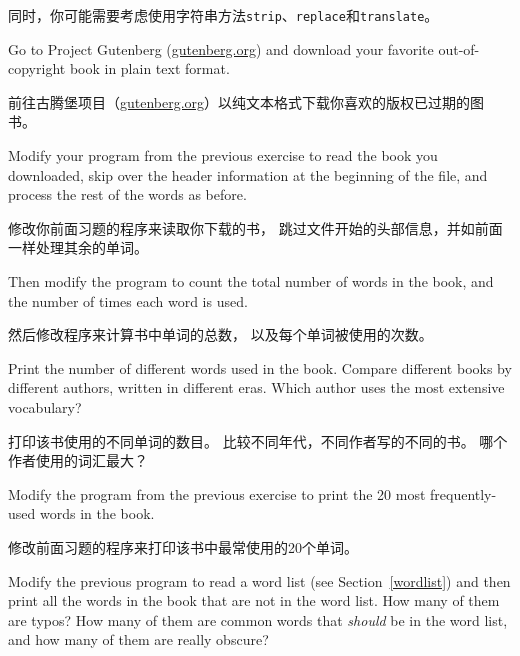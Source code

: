 \documentclass[10pt]{book}
\begin{document}
\begin{CJK}{UTF8}{gbsn}
\begin{exercise}
同时，你可能需要考虑使用字符串方法{\tt strip}、{\tt replace}和{\tt translate}。

\end{exercise}


\begin{exercise}

Go to Project Gutenberg (\url{gutenberg.org}) and download 
your favorite out-of-copyright book in plain text format.

前往古腾堡项目（\url{gutenberg.org}）以纯文本格式下载你喜欢的版权已过期的图书。

Modify your program from the previous exercise to read the book
you downloaded, skip over the header information at the beginning
of the file, and process the rest of the words as before.

修改你前面习题的程序来读取你下载的书，
跳过文件开始的头部信息，并如前面一样处理其余的单词。

Then modify the program to count the total number of words in
the book, and the number of times each word is used.

然后修改程序来计算书中单词的总数，
以及每个单词被使用的次数。

Print the number of different words used in the book.  Compare
different books by different authors, written in different eras.
Which author uses the most extensive vocabulary?

打印该书使用的不同单词的数目。
比较不同年代，不同作者写的不同的书。
哪个作者使用的词汇最大？

\end{exercise}


\begin{exercise}

Modify the program from the previous exercise to print the
20 most frequently-used words in the book.

修改前面习题的程序来打印该书中最常使用的20个单词。

\end{exercise}


\begin{exercise}

Modify the previous program to read a word list (see
Section~\ref{wordlist}) and then print all the words in the book that
are not in the word list.  How many of them are typos?  How many of
them are common words that {\em should} be in the word list, and how
many of them are really obscure?


\end{exercise}
\end{CJK}
\end{document}
